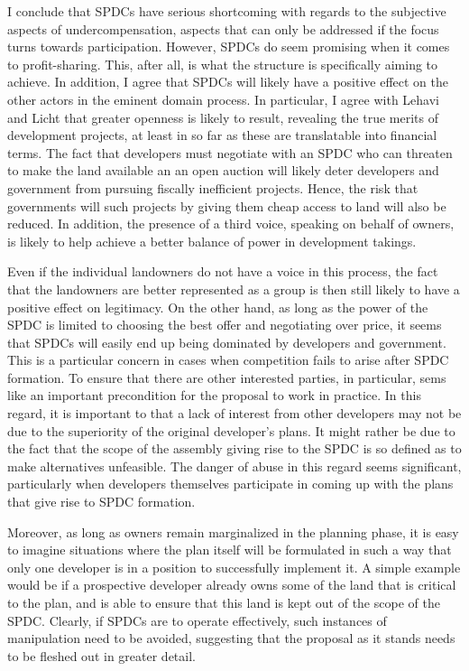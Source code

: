I conclude that SPDCs have serious shortcoming with regards to the subjective aspects of undercompensation, aspects that can only be addressed if the focus turns towards participation. However, SPDCs do seem promising when it comes to profit-sharing. This, after all, is what the structure is specifically aiming to achieve. In addition, I agree that SPDCs will likely have a positive effect on the other actors in the eminent domain process. In particular, I agree with Lehavi and Licht that greater openness is likely to result, revealing the true merits of development projects, at least in so far as these are translatable into financial terms. The fact that developers must negotiate with an SPDC who can threaten to make the land available an an open auction will likely deter developers and government from pursuing fiscally inefficient projects. Hence, the risk that governments will  such projects by giving them cheap access to land will also be reduced. In addition, the presence of a third voice, speaking on behalf of owners, is likely to help achieve a better balance of power in development takings. 

Even if the individual landowners do not have a voice in this process, the fact that the landowners are better represented as a group is then still likely to have a positive effect on legitimacy. On the other hand, as long as the power of the SPDC is limited to choosing the best offer and negotiating over price, it seems that SPDCs will easily end up being dominated by developers and government. This is a particular concern in cases when competition fails to arise after SPDC formation. To ensure that there are other interested parties, in particular, sems like an important precondition for the proposal to work in practice. In this regard, it is important to  that a lack of interest from other developers may not be due to the superiority of the original developer's plans. It might rather be due to the fact that the scope of the assembly giving rise to the SPDC is so defined as to make alternatives unfeasible. The danger of abuse in this regard seems significant, particularly when developers themselves participate in coming up with the plans that give rise to SPDC formation. 

Moreover, as long as owners remain marginalized in the planning phase, it is easy to imagine situations where the plan itself will be formulated in such a way that only one developer is in a position to successfully implement it. A simple example would be if a prospective developer already owns some of the land that is critical to the plan, and is able to ensure that this land is kept out of the scope of the SPDC. Clearly, if SPDCs are to operate effectively, such instances of manipulation need to be avoided, suggesting that the proposal as it stands needs to be fleshed out in greater detail.

